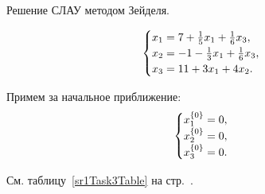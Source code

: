 \documentclass[10pt, a4paper, titlepage]{article}
\begin{document}
Решение СЛАУ методом Зейделя.

\begin{equation*}
    \begin{cases}
        $$x_1=7+\frac{1}{5}x_1+\frac{1}{6}x_3$$, \\
        $$x_2=-1-\frac{1}{3}x_1+\frac{1}{6}x_3$$, \\
        $$x_3=11+3x_1+4x_2$$.
    \end{cases}
\end{equation*}

Примем за начальное приближение:
\begin{equation*}
    \begin{cases}
        $$x_1^{\{0\}}=0$$, \\
        $$x_2^{\{0\}}=0$$, \\
        $$x_3^{\{0\}}=0$$.
    \end{cases}
\end{equation*}

См. таблицу~\ref{sr1Task3Table} на стр.~\pageref{sr1Task3Table}.
\end{document}

